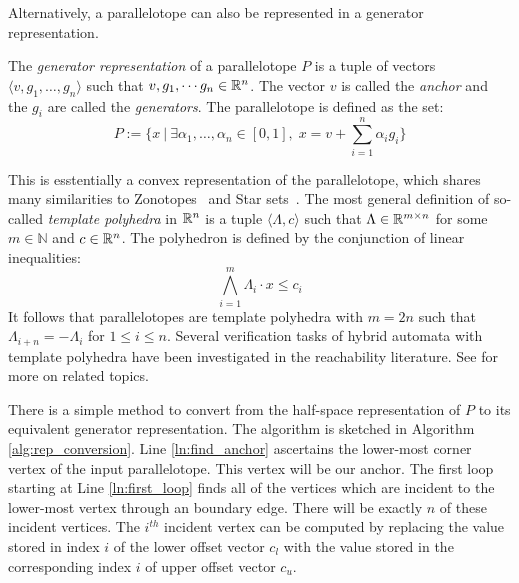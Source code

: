 \noindent Alternatively, a parallelotope can also be represented in a generator representation.
%
\begin{definition}
\label{def:generator_def}
The \emph{generator representation} of a parallelotope $P$ is a tuple of vectors $\langle v, g_1, \ldots, g_n\rangle$ such that $v,g_1, \cdots g_n \in {\mathbb{R}}^n$. The vector  $v$ is called the \emph{anchor} and the $g_i$ are called the \emph{generators}. The parallelotope is defined as the set:
$$
P := \{ x ~|~ \exists \alpha_1, \ldots, \alpha_n \in [0,1], \; x = v + \sum_{i=1}^n \alpha_i g_i \}
$$
\end{definition}
%
\begin{remark}
  \noindent This is esstentially a convex representation of the parallelotope, which shares many similarities to Zonotopes~\cite{girard2005reachability,althoff2010computing} and Star sets~\cite{duggirala2016parsimonious}.
  The most general definition of so-called \emph{template polyhedra} in ${\mathbb{R}}^n$ is a tuple $\langle \Lambda, c \rangle$ such that $\Lambda \in {\mathbb{R}}^{m \times n}$ for some $m \in \mathbb{N}$ and $c \in {\mathbb{R}}^n$. The polyhedron is defined by the conjunction of linear
 inequalities:
%
 \begin{equation}
  \bigwedge_{i=1}^m \Lambda_i \cdot x \leq c_i
 \end{equation}
It follows that parallelotopes are template polyhedra with $m=2n$ such that $\Lambda_{i+n} = -\Lambda_{i}$ for $1 \leq i \leq n$. Several verification tasks of hybrid automata with template polyhedra have been investigated in the reachability literature. See \cite{dang2011template, gronski2019template, sankaranarayanan2008symbolic} for more on related topics.
\end{remark}
%
There is a simple method to convert from the half-space representation of $P$ to its equivalent generator representation. The algorithm is sketched in Algorithm \ref{alg:rep_conversion}.
%
Line \ref{ln:find_anchor} ascertains the lower-most corner vertex of the input parallelotope. This vertex will be our anchor. The first loop starting at Line \ref{ln:first_loop} finds all of the vertices which are incident to the lower-most vertex through an boundary edge. There will be exactly $n$ of these incident vertices. The $i^{th}$ incident vertex can be computed by replacing the value stored in index $i$ of the lower offset vector $c_l$ with the value stored in the corresponding index $i$ of upper offset vector $c_u$.
